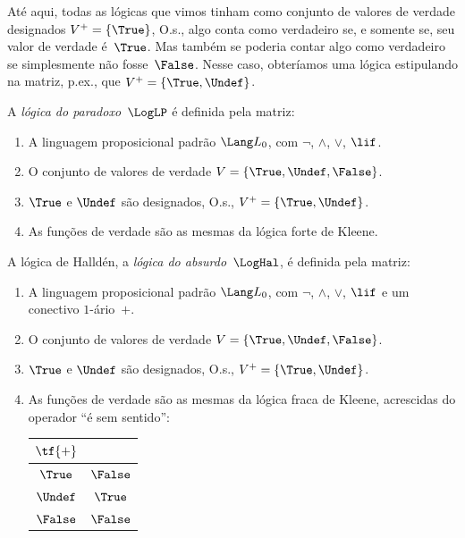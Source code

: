 \documentclass[../../../include/open-logic-section]{subfiles}
\begin{document}


Até aqui, todas as lógicas que vimos tinham como conjunto de valores de verdade
designados $V^+ = \{\True\}$, O.s.\@, algo conta como verdadeiro se, e somente se, seu valor de
verdade é~$\True$. Mas também se poderia contar algo como verdadeiro se simplesmente
não fosse~$\False$. Nesse caso, obteríamos uma lógica estipulando na
matriz, p.ex., que $V^+ = \{\True, \Undef\}$.

\begin{defn}
A \emph{lógica do paradoxo}~$\LogLP$ é definida pela matriz:
\begin{enumerate}
  \item A linguagem proposicional padrão $\Lang L_0$, com
  $\lnot$, $\land$, $\lor$, $\lif$.
  \item O conjunto de valores de verdade $V = \{\True, \Undef, \False\}$.
  \item $\True$ e $\Undef$ são designados, O.s.\@, $V^+ = \{\True, \Undef\}$.
  \item As funções de verdade são as mesmas da lógica forte de Kleene.
\end{enumerate}
\end{defn}

\begin{defn}
A lógica de Halld\'en, a \emph{lógica do absurdo}~$\LogHal$, é definida pela matriz:
\begin{enumerate}
  \item A linguagem proposicional padrão $\Lang L_0$, com
  $\lnot$, $\land$, $\lor$, $\lif$ e um conectivo $1$-ário~$+$.
  \item O conjunto de valores de verdade $V = \{\True, \Undef, \False\}$.
  \item $\True$ e $\Undef$ são designados, O.s.\@, $V^+ = \{\True, \Undef\}$.
  \item As funções de verdade são as mesmas da lógica fraca de Kleene, acrescidas do
  operador ``é sem sentido'':
  \begin{center}
    \begin{tabular}{c|c} 
    $\tf{+}$ & \\ 
    \hline  
    $\True$ & $\False$ \\ 
    $\Undef$ & $\True$ \\
    $\False$ & $\False$ 
    \end{tabular}
  \end{center}
\end{enumerate}
\end{defn}
\end{document}
